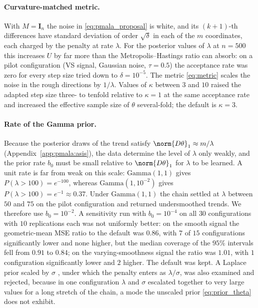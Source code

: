 \paragraph{Curvature-matched metric.} With $M = \mathbf{I}_n$ the noise in \eqref{eq:pmala_proposal} is white, and its $(k+1)$-th differences have standard deviation of order $\sqrt{\delta}$ in each of the $m$ coordinates, each charged by the penalty at rate $\lambda$. For the posterior values of $\lambda$ at $n = 500$ this increases $U$ by far more than the Metropolis--Hastings ratio can absorb: on a pilot configuration (VS signal, Gaussian noise, $\tau = 0.5$) the acceptance rate was zero for every step size tried down to $\delta = 10^{-5}$. The metric \eqref{eq:metric} scales the noise in the rough directions by $1/\lambda$. Values of $\kappa$ between $3$ and $10$ raised the adapted step size three- to tenfold relative to $\kappa = 1$ at the same acceptance rate and increased the effective sample size of $\theta$ several-fold; the default is $\kappa = 3$.

\paragraph{Rate of the Gamma prior.} Because the posterior draws of the trend satisfy $\norm{D\theta}_1 \approx m/\lambda$ (Appendix~\ref{app:pmala:asis}), the data determine the level of $\lambda$ only weakly, and the prior rate $b_0$ must be small relative to $\norm{D\theta}_1$ for $\lambda$ to be learned. A unit rate is far from weak on this scale: $\mathrm{Gamma}(1,1)$ gives $P(\lambda > 100) = e^{-100}$, whereas $\mathrm{Gamma}(1, 10^{-2})$ gives $P(\lambda > 100) = e^{-1} \approx 0.37$. Under $\mathrm{Gamma}(1,1)$ the chain settled at $\lambda$ between $50$ and $75$ on the pilot configuration and returned undersmoothed trends. We therefore use $b_0 = 10^{-2}$. A sensitivity run with $b_0 = 10^{-4}$ on all $30$ configurations with $10$ replications each was not uniformly better: on the smooth signal the geometric-mean MSE ratio to the default was $0.86$, with $7$ of $15$ configurations significantly lower and none higher, but the median coverage of the $95\%$ intervals fell from $0.91$ to $0.84$; on the varying-smoothness signal the ratio was $1.01$, with $1$ configuration significantly lower and $2$ higher. The default was kept. A Laplace prior scaled by $\sigma$ \citep{park2008bayesian}, under which the penalty enters as $\lambda/\sigma$, was also examined and rejected, because in one configuration $\lambda$ and $\sigma$ escalated together to very large values for a long stretch of the chain, a mode the unscaled prior \eqref{eq:prior_theta} does not exhibit.


